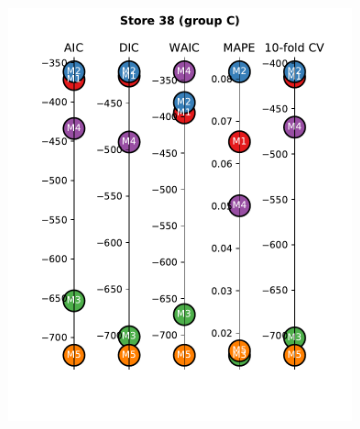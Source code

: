 \documentclass[english, 12pt, a4paper, sci, utf8, a-1b, online]{aaltothesis}
\begin{document}
\begin{abstractpage}[english]
\begin{figure}[hbt]
\begin{subfigure}[htb]{0.3\textwidth}
		\includegraphics[width=\textwidth]{../plots/metrics/metrics_plot_single_store_38_of_C.pdf}
	\end{subfigure}
	\hfill
	\begin{subfigure}[htb]{0.3\textwidth}
		\centering

\end{subfigure}
\end{figure}
\end{abstractpage}
\end{document}
